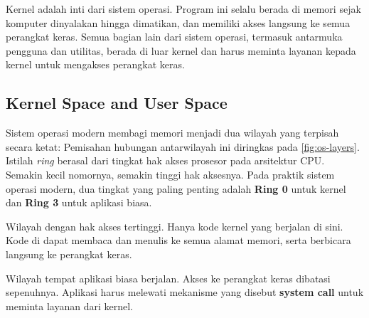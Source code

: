 Kernel adalah inti dari sistem operasi. Program ini selalu berada di memori sejak
komputer dinyalakan hingga dimatikan, dan memiliki akses langsung ke semua perangkat
keras. Semua bagian lain dari sistem operasi, termasuk antarmuka pengguna dan utilitas,
berada di luar kernel dan harus meminta layanan kepada kernel untuk mengakses perangkat
keras.

\subsection{Kernel Space and User Space}

Sistem operasi modern membagi memori menjadi dua wilayah yang terpisah secara ketat:
Pemisahan hubungan antarwilayah ini diringkas pada \cref{fig:os-layers}.
Istilah \textit{ring} berasal dari tingkat hak akses prosesor pada arsitektur CPU.
Semakin kecil nomornya, semakin tinggi hak aksesnya. Pada praktik sistem operasi modern,
dua tingkat yang paling penting adalah \textbf{Ring 0} untuk kernel dan \textbf{Ring 3}
untuk aplikasi biasa.

\begin{description}[noitemsep,topsep=2pt,parsep=0pt]
    \item[\term{Kernel space} (Ring 0)] Wilayah dengan hak akses tertinggi. Hanya kode kernel
    yang berjalan di sini. Kode di  dapat membaca dan menulis ke semua
    alamat memori, serta berbicara langsung ke perangkat keras.

    \item[\term{User space} (Ring 3)] Wilayah tempat aplikasi biasa berjalan. Akses ke
    perangkat keras dibatasi sepenuhnya. Aplikasi harus melewati mekanisme yang disebut
    \textbf{system call} untuk meminta layanan dari kernel.
\end{description}


